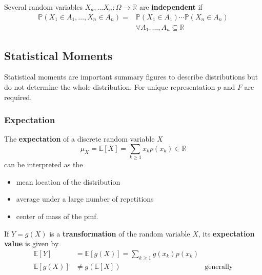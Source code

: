 Several random variables $X_a, \dots X_n :\Omega\rightarrow\mathbb{R}$ are \textbf{independent} if
\noindent\begin{align*}
    \mathbb{P}(X_1\in A_1,\ldots,X_n\in A_n) = & \mathbb{P}(X_1\in A_1)\cdots\mathbb{P}(X_n\in A_n) \\
                                               & \forall A_1,\ldots,A_n\subseteq\mathbb{R}
\end{align*}

\subsection{Statistical Moments}
Statistical moments are important summary figures to describe distributions but do not determine the whole distribution. For unique representation $p$ and $F$ are required.
\subsubsection{Expectation}
The \textbf{expectation} of a discrete random variable $X$
\noindent\begin{equation*}
    \mu_{X}=\mathbb{E}[X]=\sum_{k\geq1}x_{k}p(x_{k})\in\mathbb{R}
\end{equation*}
can be interpreted as the
\begin{itemize}
    \item mean location of the distribution
    \item average under a large number of repetitions
    \item center of mass of the pmf.
\end{itemize}

\newpar{}
If $Y=g(X)$ is a \textbf{transformation} of the random variable $X$, its \textbf{expectation value} is given by
\noindent\begin{align*}
    \mathbb{E}[Y]    & =\mathbb{E}[g(X)]=\sum_{k\geq1}g(x_{k})p(x_{k})                    \\
    \mathbb{E}[g(X)] & \neq g(\mathbb{E}[X])                           & \text{generally}
\end{align*}

